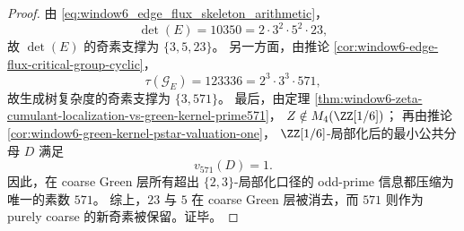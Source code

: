 \begin{proof}
由 \eqref{eq:window6_edge_flux_skeleton_arithmetic}，
\[
\det(E)=10350=2\cdot 3^2\cdot 5^2\cdot 23,
\]
故 \(\det(E)\) 的奇素支撑为 \(\{3,5,23\}\)。
另一方面，由推论 \ref{cor:window6-edge-flux-critical-group-cyclic}，
\[
\tau(\mathcal G_E)=123336=2^3\cdot 3^3\cdot 571,
\]
故生成树复杂度的奇素支撑为 \(\{3,571\}\)。
最后，由定理 \ref{thm:window6-zeta-cumulant-localization-vs-green-kernel-prime571}，
\(
Z\notin M_4(\ZZ[1/6])
\)；
再由推论 \ref{cor:window6-green-kernel-pstar-valuation-one}，
\(\ZZ[1/6]\)-局部化后的最小公共分母 \(D\) 满足
\[
v_{571}(D)=1.
\]
因此，在 coarse Green 层所有超出 \(\{2,3\}\)-局部化口径的 odd-prime 信息都压缩为唯一的素数 \(571\)。
综上，\(23\) 与 \(5\) 在 coarse Green 层被消去，而 \(571\) 则作为 purely coarse 的新奇素被保留。证毕。
\end{proof}

